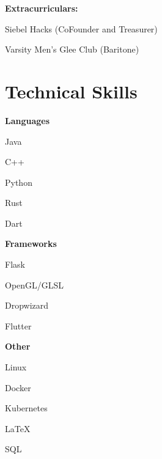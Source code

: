 \documentclass[hidelinks,11pt]{extarticle}
\newcommand{\skillset}[2] {
    \textbf{#1}
    \hfill
    \begin{citemize*}
        #2
    \end{citemize*}
}
\begin{document}
\textbf{Extracurriculars:} 
\begin{citemize*}
    \item[] Siebel Hacks (CoFounder and Treasurer) 
    \item Varsity Men's Glee Club (Baritone)
\end{citemize*}



\section{Technical Skills}
\skillset{Languages}
{
    \item[] Java 
    \item C++ 
    \item Python 
    \item Rust
    \item Dart
}

\skillset{Frameworks}
{
    \item[] Flask
    \item OpenGL/GLSL
    \item Dropwizard
    \item Flutter
}

\skillset{Other}
{
    \item[] Linux
    \item Docker
    \item Kubernetes
    \item \LaTeX
    \item SQL
}

\vfill
{\color{mycolor}\titlerule}
\end{document}
